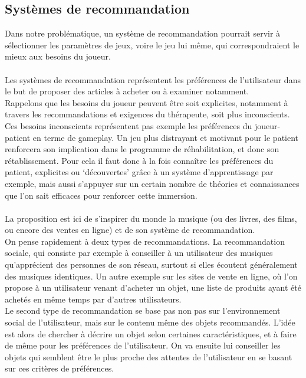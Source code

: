 	\subsection{Systèmes de recommandation}	 \label{recommandation}
Dans notre problématique, un système de recommandation pourrait servir à sélectionner les paramètres de jeux, voire le jeu lui même, qui correspondraient le mieux aux besoins du joueur.

\paragraph{}
Les systèmes de recommandation représentent les préférences de l'utilisateur dans le but de proposer des articles à acheter ou à examiner notamment.\\
Rappelons que les besoins du joueur peuvent être soit explicites, notamment à travers les recommandations et exigences du thérapeute, soit plus inconscients. Ces besoins inconscients représentent pas exemple les préférences du joueur-patient en terme de gameplay. Un jeu plus distrayant et motivant pour le patient renforcera son implication dans le programme de réhabilitation, et donc son rétablissement. Pour cela il faut donc à la fois connaître les préférences du patient, explicites ou `découvertes'  grâce à un système d'apprentissage par exemple, mais aussi s'appuyer sur un certain nombre de théories et connaissances que l'on sait efficaces pour renforcer cette immersion. 	
	 
 \paragraph{}
 La proposition est ici de s'inspirer du monde la musique (ou des livres, des films, ou encore des ventes en ligne) et de son système de recommandation.\\
On pense rapidement à deux types de recommandations. La recommandation sociale, qui consiste par exemple à conseiller à un utilisateur des musiques qu'apprécient des personnes de son réseau, surtout si elles écoutent généralement des musiques identiques. Un autre exemple sur les sites de vente en ligne, où l'on propose à un utilisateur venant d'acheter un objet, une liste de produits ayant été achetés en même temps par d'autres utilisateurs. \\
Le second type de recommandation se base pas non pas sur l'environnement social de l'utilisateur, mais sur le contenu même des objets recommandés. L'idée est alors de chercher à décrire un objet selon certaines caractéristiques, et à faire de même pour les préférences de l'utilisateur. On va ensuite lui conseiller les objets qui semblent être le plus proche des attentes de l'utilisateur en se basant sur ces critères de préférences. 
 
